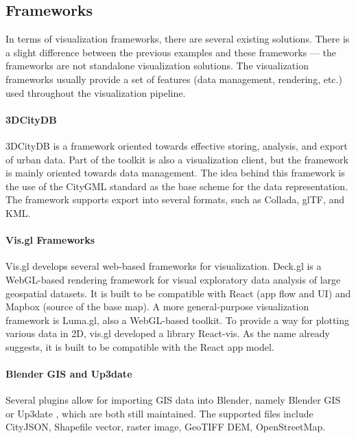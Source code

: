 \subsection{Frameworks}
\label{sec:frameworks}
In terms of visualization frameworks, there are several existing solutions. There is a slight difference between the previous examples and these frameworks --- the frameworks are not standalone visualization solutions. The visualization frameworks usually provide a set of features (data management, rendering, etc.) used throughout the visualization pipeline. 

\paragraph{3DCityDB}
3DCityDB \cite{yao20183dcitydb} is a framework oriented towards effective storing, analysis, and export of urban data. Part of the toolkit is also a visualization client, but the framework is mainly oriented towards data management. The idea behind this framework is the use of the CityGML standard as the base scheme for the data representation. The framework supports export into several formats, such as Collada, glTF, and KML.

\paragraph{Vis.gl Frameworks}
Vis.gl \cite{visgl} develops several web-based frameworks for visualization. Deck.gl is a WebGL-based rendering framework for visual exploratory data analysis of large geospatial datasets. It is built to be compatible with React (app flow and UI) and Mapbox (source of the base map). A more general-purpose visualization framework is Luma.gl, also a WebGL-based toolkit. To provide a way for plotting various data in 2D, vis.gl developed a library React-vis. As the name already suggests, it is built to be compatible with the React app model.

\paragraph{Blender GIS and Up3date}
Several plugins allow for importing GIS data into Blender, namely Blender GIS \cite{blendergis} or Up3date \cite{up3date}, which are both still maintained. The supported files include CityJSON, Shapefile vector, raster image, GeoTIFF DEM, OpenStreetMap. 


